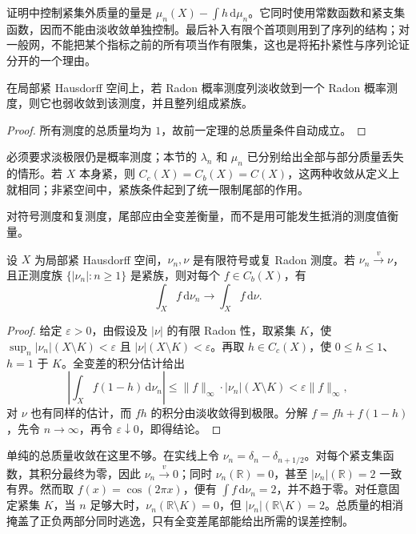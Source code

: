 证明中控制紧集外质量的量是 \(\mu_n(X)-\int h\,\mathrm d\mu_n\)。它同时使用常数函数和紧支集函数，因而不能由淡收敛单独控制。最后补入有限个首项则用到了序列的结构；对一般网，不能把某个指标之前的所有项当作有限集，这也是将拓扑紧性与序列论证分开的一个理由。

\begin{corollary}\label{b1:cor:vague-probability-weak}
在局部紧 Hausdorff 空间上，若 Radon 概率测度列淡收敛到一个 Radon 概率测度，则它也弱收敛到该测度，并且整列组成紧族。
\end{corollary}
\begin{proof}
所有测度的总质量均为 \(1\)，故前一定理的总质量条件自动成立。
\end{proof}

必须要求淡极限仍是概率测度；本节的 \(\lambda_n\) 和 \(\mu_n\) 已分别给出全部与部分质量丢失的情形。若 \(X\) 本身紧，则 \(C_c(X)=C_b(X)=C(X)\)，这两种收敛从定义上就相同；非紧空间中，紧族条件起到了统一限制尾部的作用。

\ProseParagraphBreak

对符号测度和复测度，尾部应由全变差衡量，而不是用可能发生抵消的测度值衡量。

\begin{proposition}\label{b1:prop:signed-tight-vague-weak}
设 \(X\) 为局部紧 Hausdorff 空间，\(\nu_n,\nu\) 是有限符号或复 Radon 测度。若 \(\nu_n\xrightarrow{v}\nu\)，且正测度族 \(\{|\nu_n|:n\geq1\}\) 是紧族，则对每个 \(f\in C_b(X)\)，有
\[
 \int_Xf\,\mathrm d\nu_n\longrightarrow\int_Xf\,\mathrm d\nu.
\]
\end{proposition}
\begin{proof}
给定 \(\varepsilon>0\)，由假设及 \(|\nu|\) 的有限 Radon 性，取紧集 \(K\)，使 \(\sup_n|\nu_n|(X\setminus K)<\varepsilon\) 且 \(|\nu|(X\setminus K)<\varepsilon\)。再取 \(h\in C_c(X)\)，使 \(0\leq h\leq1\)、\(h=1\) 于 \(K\)。全变差的积分估计给出
\[
 \left|\int_X f(1-h)\,\mathrm d\nu_n\right|
 \leq\|f\|_\infty\cdot|\nu_n|(X\setminus K)
 <\varepsilon\|f\|_\infty,
\]
对 \(\nu\) 也有同样的估计，而 \(fh\) 的积分由淡收敛得到极限。分解 \(f=fh+f(1-h)\)，先令 \(n\rightarrow\infty\)，再令 \(\varepsilon\downarrow0\)，即得结论。
\end{proof}

单纯的总质量收敛在这里不够。在实线上令 \(\nu_n=\delta_n-\delta_{n+1/2}\)。对每个紧支集函数，其积分最终为零，因此 \(\nu_n\xrightarrow{v}0\)；同时 \(\nu_n(\mathbb R)=0\)，甚至 \(|\nu_n|(\mathbb R)=2\) 一致有界。然而取 \(f(x)=\cos(2\pi x)\)，便有 \(\int f\,\mathrm d\nu_n=2\)，并不趋于零。对任意固定紧集 \(K\)，当 \(n\) 足够大时，\(\nu_n(\mathbb R\setminus K)=0\)，但 \(|\nu_n|(\mathbb R\setminus K)=2\)。总质量的相消掩盖了正负两部分同时逃逸，只有全变差尾部能给出所需的误差控制。
